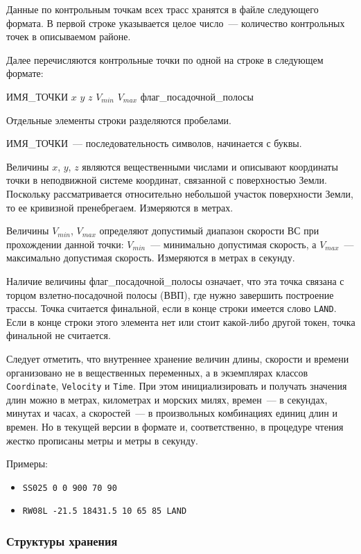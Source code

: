 \documentclass[12pt]{article}
\theoremstyle{plain}
\begin{document}
Данные по контрольным точкам всех трасс хранятся в файле следующего формата. В первой строке указывается целое число~--- количество контрольных точек в описываемом районе.

Далее перечисляются контрольные точки по одной на строке в следующем формате:
\begin{center}
ИМЯ\_ТОЧКИ $x$ $y$ $z$ $V_{min}$ $V_{max}$ флаг\_посадочной\_полосы
\end{center}
Отдельные элементы строки разделяются пробелами.

ИМЯ\_ТОЧКИ~--- последовательность символов, начинается с буквы. 

Величины $x$, $y$, $z$ являются вещественными числами и описывают координаты точки в неподвижной системе координат, связанной с поверхностью Земли. Поскольку рассматривается относительно небольшой участок поверхности Земли, то ее кривизной пренебрегаем. Измеряются в метрах.

Величины $V_{min}$, $V_{max}$ определяют допустимый диапазон скорости ВС при прохождении данной точки: $V_{min}$~--- минимально допустимая скорость, а $V_{max}$~--- максимально допустимая скорость. Измеряются в метрах в секунду.

Наличие величины флаг\_посадочной\_полосы означает, что эта точка связана с торцом взлетно-посадочной полосы (ВВП), где нужно завершить построение трассы. Точка считается финальной, если в конце строки имеется слово \texttt{LAND}. Если в конце строки этого элемента нет или стоит какой-либо другой токен, точка финальной не считается.

\medskip

Следует отметить, что внутреннее хранение величин длины, скорости и времени организовано не в вещественных переменных, а в экземплярах классов \texttt{Coordinate}, \texttt{Velocity} и \texttt{Time}. При этом инициализировать и получать значения длин можно в метрах, километрах и морских милях, времен~--- в секундах, минутах и часах, а скоростей~--- в произвольных комбинациях единиц длин и времен. Но в текущей версии в формате и, соответственно, в процедуре чтения жестко прописаны метры и метры в секунду.

Примеры:

\begin{itemize}
  \item  \texttt{SS025 0 0 900 70 90}
  \item  \texttt{RW08L -21.5 18431.5 10 65 85 LAND}
\end{itemize}


\subsubsection{Структуры хранения}
\label{sec:PointStructures}
\end{document}
